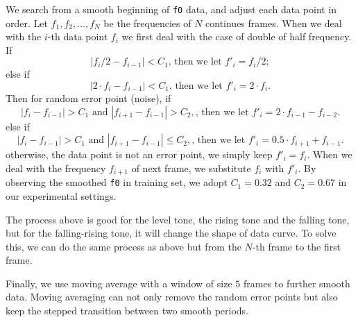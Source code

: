 \documentclass[a4paper]{article}
\begin{document}
We search from a smooth beginning of \texttt{f0} data, and adjust each data point in order. Let $f_1, f_2, \dots, f_{N}$ be the frequencies of $N$ continues frames. When we deal with the $i$-th data point $f_i$ we first deal with the case of double of half frequency. If 
\[ |f_i / 2 - f_{i-1}| < C_1 \text{, then we let } f'_i = f_i / 2;\]
else if 
\[ |2 \cdot f_i- f_{i-1}| < C_1 \text{, then we let } f'_i = 2 \cdot f_i.\]
Then for random error point (noise), if
\[|f_i - f_{i - 1}| > C_1 \text{ and } |f_{i + 1} - f_{i - 1}| > C_2,\text{, then we let } f'_i = 2 \cdot f_{i- 1} - f_{i - 2}. \]
else if
\[|f_i - f_{i - 1}| > C_1 \text{ and } |f_{i + 1} - f_{i - 1}| \leq C_2,\text{, then we let } f'_i = 0.5 \cdot f_{i + 1} + f_{i - 1}. \]
otherwise, the data point is not an error point, we simply keep $f'_i = f_i$. When we deal with the frequency $f_{i+1}$ of next frame, we substitute $f_{i}$ with $f'_i$. By observing the smoothed \texttt{f0} in training set, we adopt $C_1 = 0.32$ and $C_2 = 0.67$ in our experimental settings.

The process above is good for the level tone, the rising tone and the falling tone, but for the falling-rising tone, it will change the shape of data curve. To solve this, we can do the same process as above but from the $N$-th frame to the first frame.

Finally, we use moving average with a window of size $5$ frames to further smooth data. Moving averaging can not only remove the random error points but also keep the stepped transition between two smooth periods.
\end{document}
